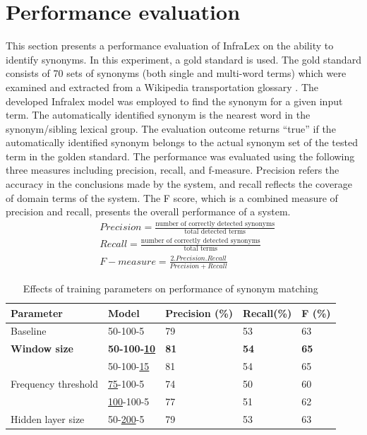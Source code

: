 \documentclass[Journal, BackFigs, DoubleSpace]{ascelike} %
\begin{document}
\section{Performance evaluation} \label{sec:eval_infralex}
This section presents a performance evaluation of InfraLex on the ability to identify synonyms. In this experiment, a gold standard  is used. The gold standard consists of 70 sets of synonyms (both single and multi-word terms) which were examined and extracted from a Wikipedia transportation glossary \cite{wikipedia16}. The developed Infralex model was employed to find the synonym for a given input term. The automatically identified synonym is the nearest word in the synonym/sibling lexical group. The evaluation outcome returns ``true'' if the automatically identified synonym belongs to the actual synonym set of the tested term in the golden standard. The performance was evaluated using the following three measures including precision, recall, and f-measure. Precision refers the accuracy in the conclusions made by the system, and recall reflects the coverage of domain terms of the system. The F score, which is a combined measure of precision and recall, presents the overall performance of a system. 
%
\begin{align} 
&Precision = \frac{\text{number of correctly detected synonyms}}{\text{total detected terms}}  \\
&Recall = \frac{\text{number of correctly detected synonyms}}{\text{total terms}}  \\ 
&F-measure = \frac{2.Precision.Recall}{Precision+Recall}
\end{align}
\begin{table} [b] 
	\caption{Effects of training parameters on performance of synonym matching}
	\label{table:eval_syn_par_effect}
	\centering
	\small
	\renewcommand{\arraystretch}{1.25}
	\begin{tabular}{l l l l l }
		\hline
		\hline
		\textbf{Parameter} & \textbf{Model} & \textbf{Precision (\%)}  & \textbf{Recall(\%)} & \textbf{F (\%)}\\
		\hline
		Baseline	&	50-100-5	&79		&53		&63\\
		\hline
		\textbf{Window size}	&\textbf{50-100-\underline{10}}	&\textbf{81}		&\textbf{54}		&\textbf{65}\\
		&50-100-\underline{15}	&81		&54		&65\\
		\hline		
		Frequency threshold	&\underline{75}-100-5	&74		&50		&60\\
		&\underline{100}-100-5	&77		&51		&62\\
		\hline
		Hidden layer size	&50-\underline{200}-5	&79		&53		&63\\
		\hline
		\hline
	\end{tabular}
	\normalsize
\end{table}
\end{document}
